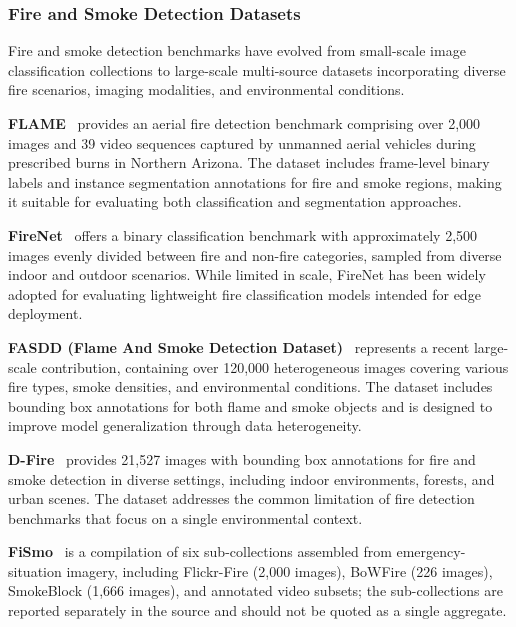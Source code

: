 \documentclass[10pt,a4paper]{article}
\begin{document}
\subsubsection{Fire and Smoke Detection Datasets}
\label{subsubsec:fire_datasets}

Fire and smoke detection benchmarks have evolved from small-scale image classification collections to large-scale multi-source datasets incorporating diverse fire scenarios, imaging modalities, and environmental conditions.

\textbf{FLAME}~\citep{shamsoshoara2021aerial} provides an aerial fire detection benchmark comprising over 2,000 images and 39 video sequences captured by unmanned aerial vehicles during prescribed burns in Northern Arizona. The dataset includes frame-level binary labels and instance segmentation annotations for fire and smoke regions, making it suitable for evaluating both classification and segmentation approaches.

\textbf{FireNet}~\citep{jadon2019firenet} offers a binary classification benchmark with approximately 2,500 images evenly divided between fire and non-fire categories, sampled from diverse indoor and outdoor scenarios. While limited in scale, FireNet has been widely adopted for evaluating lightweight fire classification models intended for edge deployment.

\textbf{FASDD (Flame And Smoke Detection Dataset)}~\citep{wang2024fasdd} represents a recent large-scale contribution, containing over 120,000 heterogeneous images covering various fire types, smoke densities, and environmental conditions. The dataset includes bounding box annotations for both flame and smoke objects and is designed to improve model generalization through data heterogeneity.

\textbf{D-Fire}~\citep{de2022dfire} provides 21,527 images with bounding box annotations for fire and smoke detection in diverse settings, including indoor environments, forests, and urban scenes. The dataset addresses the common limitation of fire detection benchmarks that focus on a single environmental context.

\textbf{FiSmo}~\citep{cazzolato2017fismo} is a compilation of six sub-collections assembled from emergency-situation imagery, including Flickr-Fire (2{,}000 images), BoWFire (226 images), SmokeBlock (1{,}666 images), and annotated video subsets; the sub-collections are reported separately in the source and should not be quoted as a single aggregate.
\end{document}
